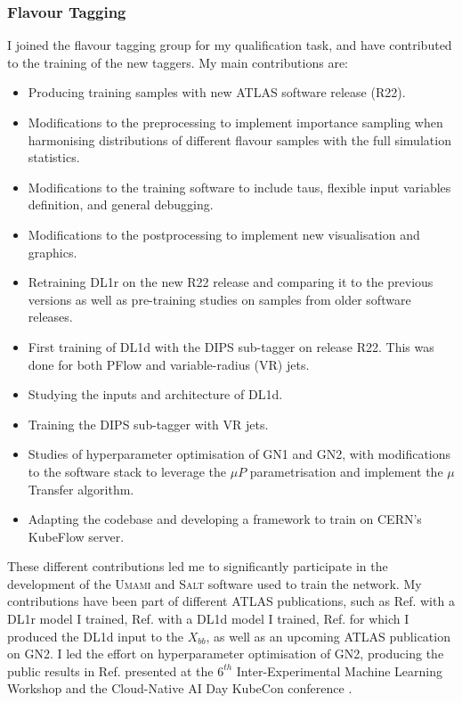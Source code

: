 \subsubsection{Flavour Tagging}
I joined the flavour tagging group for my qualification task, and have contributed to the training of the new taggers. My main contributions are:
\begin{itemize}
    \item Producing training samples with new ATLAS software release (R22).
    \item Modifications to the preprocessing to implement importance sampling when harmonising distributions of different flavour samples with the full simulation statistics.
    \item Modifications to the training software to include taus, flexible input variables definition, and general debugging.
    \item Modifications to the postprocessing to implement new visualisation and graphics. 
    \item Retraining DL1r on the new R22 release and comparing it to the previous versions as well as pre-training studies on samples from older software releases. 
    \item First training of DL1d with the DIPS sub-tagger on release R22. This was done for both PFlow and variable-radius (VR) jets.
    \item Studying the inputs and architecture of DL1d.
    \item Training the DIPS sub-tagger with VR jets.
    \item Studies of hyperparameter optimisation of GN1 and GN2, with modifications to the software stack to leverage the $\mu P$ parametrisation and implement the $\mu$Transfer algorithm.
    \item Adapting the codebase and developing a framework to train on CERN's KubeFlow server. 
\end{itemize}
These different contributions led me to significantly participate in the development of the \textsc{Umami} \cite{UmamiCite} and \textsc{Salt} \cite{SaltCite} software used to train the network. My contributions have been part of different ATLAS publications, such as Ref. \cite{ATL-PHYS-PUB-2022-027} with a DL1r model I trained, Ref. \cite{ATL-PLOT-FTAG-2023-01} with a DL1d model I trained, Ref. \cite{ATL-PHYS-PUB-2023-021} for which I produced the DL1d input to the $X_{bb}$, as well as an upcoming ATLAS publication on GN2. I led the effort on hyperparameter optimisation of GN2, producing the public results in Ref. \cite{publicplotMUP} presented at the $6^{th}$ Inter-Experimental Machine Learning Workshop \cite{IMLTalk} and the Cloud-Native AI Day KubeCon conference \cite{KubeconTalk}.

